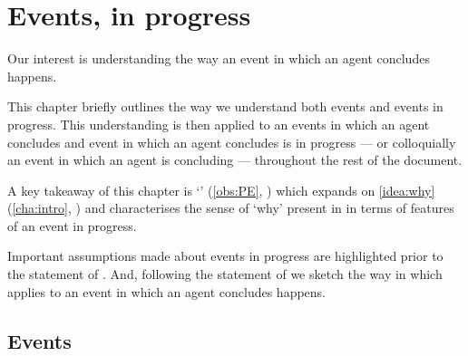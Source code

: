 \chapter{Events, in progress}
\label{cha:events-progress}


\begin{note}
  Our interest is understanding the way an event in which an agent concludes happens.

  This chapter briefly outlines the way we understand both events and events in progress.
  This understanding is then applied to an events in which an agent concludes and event in which an agent concludes is in progress --- or colloquially an event in which an agent is concluding --- throughout the rest of the document.

  A key takeaway of this chapter is `\progEx{}' (\autoref{obs:PE}, ) which expands on \autoref{idea:why} (\autoref{cha:intro}, ) and characterises the sense of `why' present in \qWhy{} in terms of features of an event in progress.

  Important assumptions made about events in progress are highlighted prior to the statement of \progEx{}.
  And, following the statement of \progEx{} we sketch the way in which \progEx{} applies to an event in which an agent concludes happens.
\end{note}


\section{Events}
\label{sec:events}

